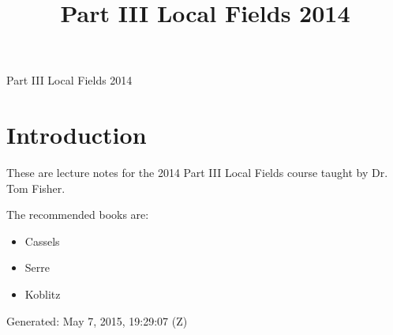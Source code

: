 \documentclass[10pt,]{book}
\title{Part III Local Fields 2014}
\author{}
\date{}
\theoremstyle{plain}
\theoremstyle{definition}
\begin{document}
\frontmatter
\thispagestyle{empty}
\begin{center}
{\Huge Part III Local Fields 2014}
\end{center}\par
{}
\clearpage
\thispagestyle{empty}
\clearpage
\maketitle
\clearpage
\thispagestyle{empty}
\clearpage
\setcounter{tocdepth}{1}
\renewcommand*\contentsname{Contents}
\tableofcontents
\mainmatter
\typeout{************************************************}
\typeout{************************************************}
\chapter[Introduction]{Introduction}\label{chap-introduction}
These are lecture notes for the 2014 Part III Local Fields course taught by Dr. Tom Fisher.%
\par
The recommended books are:
        \begin{itemize}
\item{}Cassels\item{}Serre\item{}Koblitz\end{itemize}

\par
Generated: May 7, 2015, 19:29:07 (Z)%
\typeout{************************************************}
\typeout{************************************************}
\end{document}

